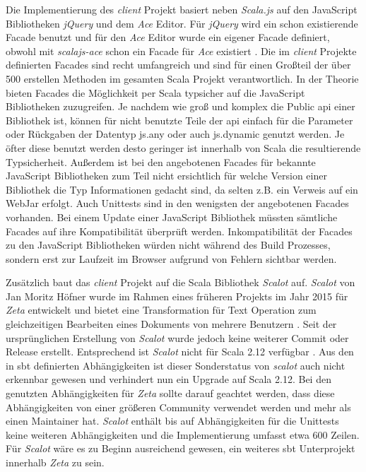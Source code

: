 Die Implementierung des \textit{client} Projekt basiert neben \textit{Scala.js} auf den JavaScript Bibliotheken \textit{jQuery} und dem \textit{Ace} Editor. Für \textit{jQuery} wird ein schon existierende Facade benutzt und für den \textit{Ace} Editor wurde ein eigener Facade definiert, obwohl mit \textit{scalajs-ace} schon ein Facade für \textit{Ace} existiert \cite{scalajs_js_libs}. Die im \textit{client} Projekte definierten Facades sind recht umfangreich und sind für einen Großteil der über 500 erstellen Methoden im gesamten Scala Projekt verantwortlich. In der Theorie bieten Facades die Möglichkeit per Scala typsicher auf die JavaScript Bibliotheken zuzugreifen. Je nachdem wie groß und komplex die Public \ac{api} einer Bibliothek ist, können für nicht benutzte Teile der \ac{api} einfach für die Parameter oder Rückgaben der Datentyp js.any oder auch js.dynamic genutzt werden. Je öfter diese benutzt werden desto geringer ist innerhalb von Scala die resultierende Typsicherheit. Außerdem ist bei den angebotenen Facades für bekannte JavaScript Bibliotheken zum Teil nicht ersichtlich für welche Version einer Bibliothek die Typ Informationen gedacht sind, da selten z.B. ein Verweis auf ein WebJar erfolgt. Auch Unittests sind in den wenigsten der angebotenen Facades vorhanden. Bei einem Update einer JavaScript Bibliothek müssten sämtliche Facades auf ihre Kompatibilität überprüft werden. Inkompatibilität der Facades zu den JavaScript Bibliotheken würden nicht während des Build Prozesses, sondern erst zur Laufzeit im Browser aufgrund von Fehlern sichtbar werden.

Zusätzlich baut das \textit{client} Projekt auf die Scala Bibliothek \textit{Scalot} auf. \textit{Scalot} von Jan Moritz Höfner wurde im Rahmen eines früheren Projekts im Jahr 2015 für \textit{Zeta} entwickelt und bietet eine Transformation für Text Operation zum gleichzeitigen Bearbeiten eines Dokuments von mehrere Benutzern \cite{scalot}. Seit der ursprünglichen Erstellung von \textit{Scalot} wurde jedoch keine weiterer Commit oder Release erstellt. Entsprechend ist \textit{Scalot} nicht für Scala 2.12 verfügbar \cite{scalot_releases}. Aus den in \ac{sbt} definierten Abhängigkeiten ist dieser Sonderstatus von \textit{scalot} auch nicht erkennbar gewesen und verhindert nun ein Upgrade auf Scala 2.12. Bei den genutzten Abhängigkeiten für \textit{Zeta} sollte darauf geachtet werden, dass diese Abhängigkeiten von einer größeren Community verwendet werden und mehr als einen Maintainer hat. \textit{Scalot} enthält bis auf Abhängigkeiten für die Unittests keine weiteren Abhängigkeiten und die Implementierung umfasst etwa 600 Zeilen. Für \textit{Scalot} wäre es zu Beginn ausreichend gewesen, ein weiteres \ac{sbt} Unterprojekt innerhalb \textit{Zeta} zu sein. 

